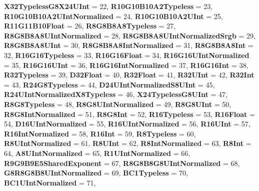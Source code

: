 \begin{DoxyCompactItemize}
{\bfseries X32\+Typeless\+G8\+X24\+U\+Int} = 22, 
{\bfseries R10\+G10\+B10\+A2\+Typeless} = 23, 
\newline
{\bfseries R10\+G10\+B10\+A2\+U\+Int\+Normalized} = 24, 
{\bfseries R10\+G10\+B10\+A2\+U\+Int} = 25, 
{\bfseries R11\+G11\+B10\+Float} = 26, 
{\bfseries R8\+G8\+B8\+A8\+Typeless} = 27, 
\newline
{\bfseries R8\+G8\+B8\+A8\+U\+Int\+Normalized} = 28, 
{\bfseries R8\+G8\+B8\+A8\+U\+Int\+Normalized\+Srgb} = 29, 
{\bfseries R8\+G8\+B8\+A8\+U\+Int} = 30, 
{\bfseries R8\+G8\+B8\+A8\+Int\+Normalized} = 31, 
\newline
{\bfseries R8\+G8\+B8\+A8\+Int} = 32, 
{\bfseries R16\+G16\+Typeless} = 33, 
{\bfseries R16\+G16\+Float} = 34, 
{\bfseries R16\+G16\+U\+Int\+Normalized} = 35, 
\newline
{\bfseries R16\+G16\+U\+Int} = 36, 
{\bfseries R16\+G16\+Int\+Normalized} = 37, 
{\bfseries R16\+G16\+Int} = 38, 
{\bfseries R32\+Typeless} = 39, 
\newline
{\bfseries D32\+Float} = 40, 
{\bfseries R32\+Float} = 41, 
{\bfseries R32\+U\+Int} = 42, 
{\bfseries R32\+Int} = 43, 
\newline
{\bfseries R24\+G8\+Typeless} = 44, 
{\bfseries D24\+U\+Int\+Normalized\+S8\+U\+Int} = 45, 
{\bfseries R24\+U\+Int\+Normalized\+X8\+Typeless} = 46, 
{\bfseries X24\+Typeless\+G8\+U\+Int} = 47, 
\newline
{\bfseries R8\+G8\+Typeless} = 48, 
{\bfseries R8\+G8\+U\+Int\+Normalized} = 49, 
{\bfseries R8\+G8\+U\+Int} = 50, 
{\bfseries R8\+G8\+Int\+Normalized} = 51, 
\newline
{\bfseries R8\+G8\+Int} = 52, 
{\bfseries R16\+Typeless} = 53, 
{\bfseries R16\+Float} = 54, 
{\bfseries D16\+U\+Int\+Normalized} = 55, 
\newline
{\bfseries R16\+U\+Int\+Normalized} = 56, 
{\bfseries R16\+U\+Int} = 57, 
{\bfseries R16\+Int\+Normalized} = 58, 
{\bfseries R16\+Int} = 59, 
\newline
{\bfseries R8\+Typeless} = 60, 
{\bfseries R8\+U\+Int\+Normalized} = 61, 
{\bfseries R8\+U\+Int} = 62, 
{\bfseries R8\+Int\+Normalized} = 63, 
\newline
{\bfseries R8\+Int} = 64, 
{\bfseries A8\+U\+Int\+Normalized} = 65, 
{\bfseries R1\+U\+Int\+Normalized} = 66, 
{\bfseries R9\+G9\+B9\+E5\+Shared\+Exponent} = 67, 
\newline
{\bfseries R8\+G8\+B8\+G8\+U\+Int\+Normalized} = 68, 
{\bfseries G8\+R8\+G8\+B8\+U\+Int\+Normalized} = 69, 
{\bfseries B\+C1\+Typeless} = 70, 
{\bfseries B\+C1\+U\+Int\+Normalized} = 71, 

\end{DoxyCompactItemize}
